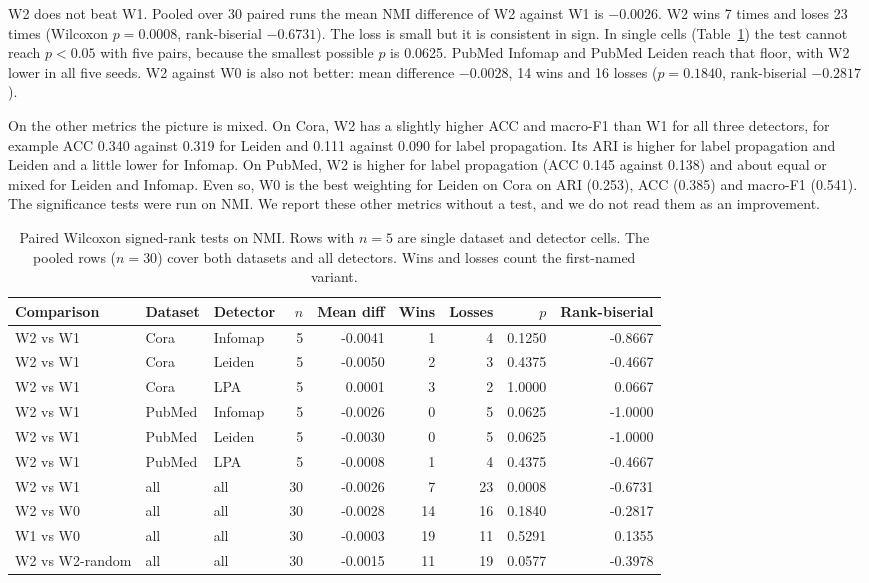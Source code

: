 W2 does not beat W1. Pooled over 30 paired runs the mean NMI difference of W2 against W1 is $-0.0026$. W2 wins 7 times and loses 23 times (Wilcoxon $p=0.0008$, rank-biserial $-0.6731$). The loss is small but it is consistent in sign. In single cells (Table~\ref{tab:sig}) the test cannot reach $p<0.05$ with five pairs, because the smallest possible $p$ is 0.0625. PubMed Infomap and PubMed Leiden reach that floor, with W2 lower in all five seeds. W2 against W0 is also not better: mean difference $-0.0028$, 14 wins and 16 losses ($p=0.1840$, rank-biserial $-0.2817$).

On the other metrics the picture is mixed. On Cora, W2 has a slightly higher ACC and macro-F1 than W1 for all three detectors, for example ACC 0.340 against 0.319 for Leiden and 0.111 against 0.090 for label propagation. Its ARI is higher for label propagation and Leiden and a little lower for Infomap. On PubMed, W2 is higher for label propagation (ACC 0.145 against 0.138) and about equal or mixed for Leiden and Infomap. Even so, W0 is the best weighting for Leiden on Cora on ARI (0.253), ACC (0.385) and macro-F1 (0.541). The significance tests were run on NMI. We report these other metrics without a test, and we do not read them as an improvement.

\begin{table}[!t]
\centering
\caption{Paired Wilcoxon signed-rank tests on NMI. Rows with $n=5$ are single dataset and detector cells. The pooled rows ($n=30$) cover both datasets and all detectors. Wins and losses count the first-named variant.}
\label{tab:sig}
\small
\begin{tabular}{@{}lllrrrrrr@{}}
\toprule
Comparison & Dataset & Detector & $n$ & Mean diff & Wins & Losses & $p$ & Rank-biserial \\
\midrule
W2 vs W1 & Cora & Infomap & 5 & -0.0041 & 1 & 4 & 0.1250 & -0.8667 \\
W2 vs W1 & Cora & Leiden & 5 & -0.0050 & 2 & 3 & 0.4375 & -0.4667 \\
W2 vs W1 & Cora & LPA & 5 & 0.0001 & 3 & 2 & 1.0000 & 0.0667 \\
W2 vs W1 & PubMed & Infomap & 5 & -0.0026 & 0 & 5 & 0.0625 & -1.0000 \\
W2 vs W1 & PubMed & Leiden & 5 & -0.0030 & 0 & 5 & 0.0625 & -1.0000 \\
W2 vs W1 & PubMed & LPA & 5 & -0.0008 & 1 & 4 & 0.4375 & -0.4667 \\
W2 vs W1 & all & all & 30 & -0.0026 & 7 & 23 & 0.0008 & -0.6731 \\
W2 vs W0 & all & all & 30 & -0.0028 & 14 & 16 & 0.1840 & -0.2817 \\
W1 vs W0 & all & all & 30 & -0.0003 & 19 & 11 & 0.5291 & 0.1355 \\
W2 vs W2-random & all & all & 30 & -0.0015 & 11 & 19 & 0.0577 & -0.3978 \\
\bottomrule
\end{tabular}
\end{table}


